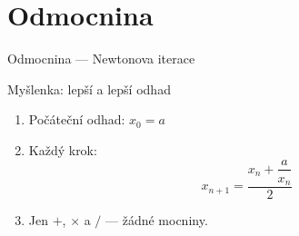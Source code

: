 \documentclass[12pt]{beamer}
\begin{document}
\section{Odmocnina}

\begin{frame}{Odmocnina --- Newtonova iterace}

    \begin{block}{Myšlenka: lepší a lepší odhad}
        \begin{enumerate}
            \item<1-> Počáteční odhad: $x_0 = a$
            \item<2-> Každý krok:
                \[
                    x_{n+1} = \frac{x_n + \dfrac{a}{x_n}}{2}
                \]
            \item<3-> Jen $+$, $\times$ a $/$ --- žádné mocniny.
        \end{enumerate}
    \end{block}


\end{frame}
\end{document}
